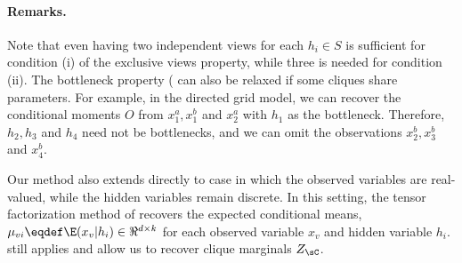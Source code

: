 
\paragraph{Remarks.}
Note that even having two independent views for each $h_i \in S$ is sufficient for condition (i)
  of the exclusive views property, while three is needed for condition (ii).
The bottleneck property ( can also be relaxed if some cliques
  share parameters.
For example, in the directed grid model, we can recover the conditional moments $O$ from
  $x^a_1, x^b_1$ and $x^a_2$ with $h_1$ as the bottleneck.
  Therefore, $h_2, h_3$ and $h_4$
  need not be bottlenecks, and we can omit the observations $x^b_2, x^b_3$ and $x^b_4$.

Our method also extends directly to case in which the observed variables
  are real-valued, while the hidden variables remain discrete. 
In this setting, the tensor factorization method of
  \citet{anandkumar13tensor} recovers the expected conditional means,
  $\mu_{vi} \eqdef \E(x_v | h_i) \in \Re^{d \times k}$ for each observed variable $x_v$ and
  hidden variable $h_i$.
still applies and allow us to recover clique marginals $Z_\sC$.

